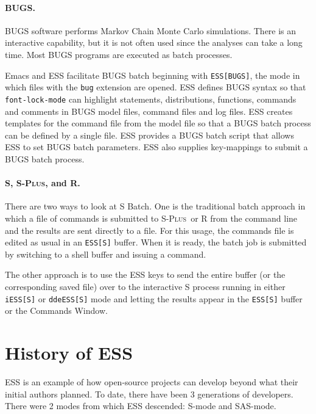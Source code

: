 \documentclass{article}
\newcommand*{\Splus}{\textsc{S-Plus}}
\newcommand{\stexttt}[1]{{\small\texttt{#1}}}
\begin{document}
\paragraph{BUGS.}
\label{sec:bugs-batch}
  
BUGS software performs Markov Chain Monte Carlo simulations.  There is
an interactive capability, but it is not often used since the analyses
can take a long time. %
Most BUGS programs are executed as batch processes.

Emacs and ESS facilitate BUGS batch beginning with
\stexttt{ESS[BUGS]}, the mode in which files with the \stexttt{bug}
extension are opened.  ESS defines BUGS syntax so that
\stexttt{font-lock-mode} can highlight statements, distributions,
functions, commands and comments in BUGS model files, command files
and log files.  ESS creates templates for the command file from the
model file so that a BUGS batch process can be defined by a single
file.  ESS provides a BUGS batch script that allows ESS to set BUGS
batch parameters.  ESS also supplies key-mappings to submit a BUGS
batch process.

\paragraph{S, \Splus, and R.}
There are two ways to look at S Batch.  One is the traditional batch
approach in which a file of commands is submitted to \Splus\ or R from
the command line and the results are sent directly to a file.  For
this usage, the commands file is edited as usual in an \stexttt{ESS[S]}
buffer.  When it is ready, the batch job is submitted by switching to a
shell buffer and issuing a command.

The other approach is to use the ESS keys to send the entire buffer
(or the corresponding saved file) over to the interactive S process
running in either \stexttt{iESS[S]} or \stexttt{ddeESS[S]} mode and
letting the results appear in the \stexttt{ESS[S]} buffer or the
Commands Window.


\section{History of ESS}
\label{sec:ESS:history}

ESS is an example of how open-source projects can develop beyond what 
their initial authors planned.  To date, there have been 3 generations 
of developers.
There were 2 modes from which ESS descended:  S-mode and SAS-mode.
\end{document}
